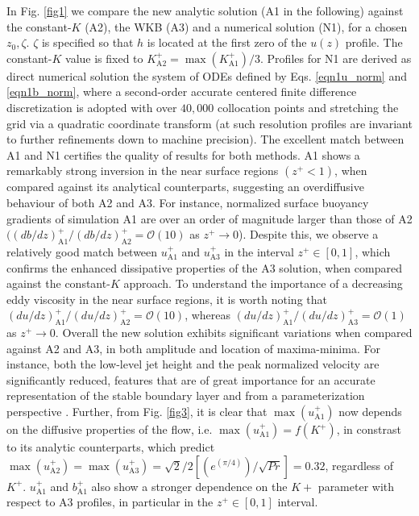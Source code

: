 %
In Fig. \ref{fig1} we compare the new analytic solution (A1 in the following) against the constant-$K$ (A2), the WKB (A3) and a numerical solution (N1), for a chosen $z_0,\zeta$. $\zeta$ is specified so that $h$ is located at the first zero of the $u(z)$ profile. 
The constant-$K$ value is fixed to $K^+_{\mathrm{A2}} = \max(K_{\mathrm{A1}}^+)/3$. 
Profiles for N1 are derived as direct numerical solution the system of ODEs defined by Eqs. \ref{eqn1u_norm} and \ref{eqn1b_norm}, where a second-order accurate centered finite difference discretization is adopted with over $40,000$ collocation points and stretching the grid via a quadratic coordinate transform (at such resolution profiles are invariant to further refinements down to machine precision).
The excellent match between A1 and N1 certifies the quality of results for both methods. 
A1 shows a remarkably strong inversion in the near surface regions $(z^+ <1)$, when compared against its analytical counterparts, suggesting an overdiffusive behaviour of both A2 and A3. 
For instance, normalized surface buoyancy gradients of simulation A1 are over an order of magnitude larger than those of A2 $( (db/dz)^+_\mathrm{A1}/(db/dz)^+_\mathrm{A2} = \mathcal{O}(10)$ as $z^+ \rightarrow 0$).
Despite this, we observe a relatively good match between $u^+_\mathrm{A1}$ and $u^+_\mathrm{A3}$ in the interval $z^+ \in [0,1]$, which confirms the enhanced dissipative properties of the A3 solution, when compared against the constant-$K$ approach. 
To understand the importance of a decreasing eddy viscosity in the near surface regions, it is worth noting that $(du/dz)^+_\mathrm{A1}/(du/dz)^+_\mathrm{A2} = \mathcal{O}(10)$, whereas $(du/dz)^+_\mathrm{A1}/(du/dz)^+_\mathrm{A3}= \mathcal{O}(1)$ as $z^+ \rightarrow 0$.
Overall the new solution exhibits significant variations when compared against A2 and A3, in both amplitude and location of maxima-minima. 
For instance, both the low-level jet height and the peak normalized velocity are significantly reduced, features that are of great importance for an accurate representation of the stable boundary layer and from a parameterization perspective \citep{Mahrt1998}.
Further, from Fig. \ref{fig3}, it is clear that $\max{(u^+_\mathrm{A1})}$ now depends on the diffusive properties of the flow, i.e. $\max{(u^+_{\mathrm{A1}})} = f(K^+)$, in constrast to its analytic counterparts, which predict $\max{(u^+_\mathrm{A2})} = \max{(u^+_\mathrm{A3})} =  \sqrt{2}/2 [(e^{(\pi/4)})/\sqrt{Pr}] = 0.32$, regardless of $K^+$.
$u^+_{\mathrm{A1}}$ and $b^+_{\mathrm{A1}}$ also show a stronger dependence on the $K+$ parameter with respect to A3 profiles, in particular in the $z^+ \in [0,1]$ interval.
